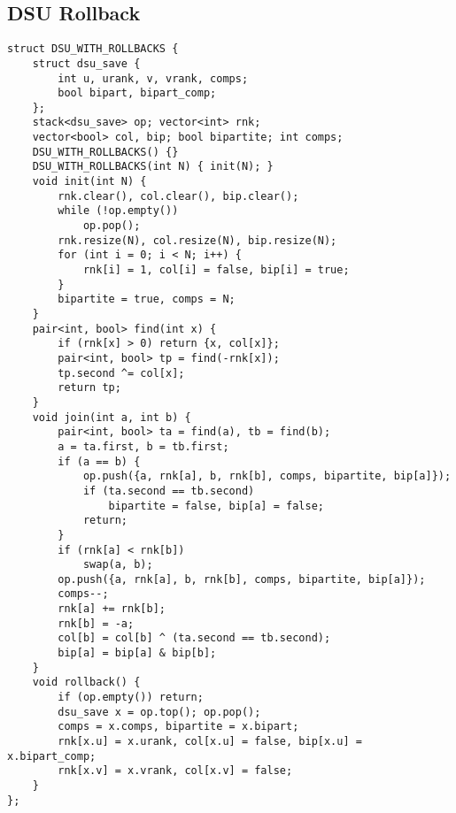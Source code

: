 \documentclass[landscape, 8pt, a4paper, oneside]{extarticle}
\begin{document}
\begin{multicols}{3}
\subsection{DSU Rollback}
\begin{verbatim}
struct DSU_WITH_ROLLBACKS {
    struct dsu_save {
        int u, urank, v, vrank, comps;
        bool bipart, bipart_comp;
    };
    stack<dsu_save> op; vector<int> rnk;
    vector<bool> col, bip; bool bipartite; int comps;
    DSU_WITH_ROLLBACKS() {}
    DSU_WITH_ROLLBACKS(int N) { init(N); }
    void init(int N) {
        rnk.clear(), col.clear(), bip.clear();
        while (!op.empty())
            op.pop();
        rnk.resize(N), col.resize(N), bip.resize(N);
        for (int i = 0; i < N; i++) {
            rnk[i] = 1, col[i] = false, bip[i] = true;
        }
        bipartite = true, comps = N;
    }
    pair<int, bool> find(int x) {
        if (rnk[x] > 0) return {x, col[x]};
        pair<int, bool> tp = find(-rnk[x]);
        tp.second ^= col[x];
        return tp;
    }
    void join(int a, int b) {
        pair<int, bool> ta = find(a), tb = find(b);
        a = ta.first, b = tb.first;
        if (a == b) {
            op.push({a, rnk[a], b, rnk[b], comps, bipartite, bip[a]});
            if (ta.second == tb.second)
                bipartite = false, bip[a] = false;
            return;
        }
        if (rnk[a] < rnk[b])
            swap(a, b);
        op.push({a, rnk[a], b, rnk[b], comps, bipartite, bip[a]});
        comps--;
        rnk[a] += rnk[b];
        rnk[b] = -a;
        col[b] = col[b] ^ (ta.second == tb.second);
        bip[a] = bip[a] & bip[b];
    }
    void rollback() {
        if (op.empty()) return;
        dsu_save x = op.top(); op.pop();
        comps = x.comps, bipartite = x.bipart;
        rnk[x.u] = x.urank, col[x.u] = false, bip[x.u] = x.bipart_comp;
        rnk[x.v] = x.vrank, col[x.v] = false;
    }
};
\end{verbatim}

\end{multicols}
\end{document}
